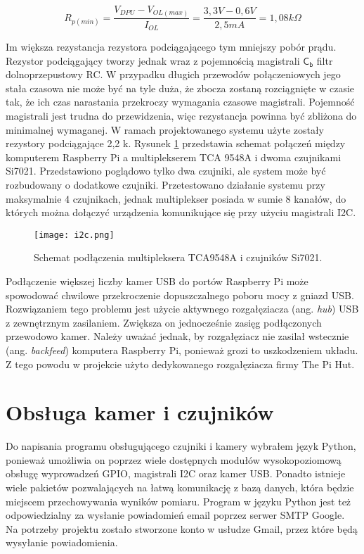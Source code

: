 \documentclass[a4paper,11pt,twoside]{article}
\begin{document}
\begin{equation} \label{pullup}
R_{p(min)} = \frac{V_{DPU} - V_{OL(max)}}{I_{OL}} = \frac{3,3 V - 0,6 V}{2,5 mA} = 1,08 k\Omega  
\end{equation} 

Im większa rezystancja rezystora podciągającego tym mniejszy pobór prądu. Rezystor podciągający tworzy jednak wraz z pojemnością magistrali $\mathsf{C_{b}}$ filtr dolnoprzepustowy RC. W przypadku długich przewodów połączeniowych jego stała czasowa nie może być na tyle duża, że zbocza zostaną rozciągnięte w czasie tak, że ich czas narastania przekroczy wymagania czasowe magistrali. Pojemność magistrali jest trudna do przewidzenia, więc rezystancja powinna być zbliżona do minimalnej wymaganej. W ramach projektowanego systemu użyte zostały rezystory podciągające 2,2 k\textOmega. Rysunek \ref{fig: i2c_schemat} przedstawia schemat połączeń między komputerem Raspberry Pi a multiplekserem TCA 9548A i dwoma czujnikami Si7021. Przedstawiono poglądowo tylko dwa czujniki, ale system może być rozbudowany o dodatkowe czujniki. Przetestowano działanie systemu przy maksymalnie 4 czujnikach, jednak multiplekser posiada w sumie 8 kanałów, do których można dołączyć urządzenia komunikujące się przy użyciu magistrali I2C.

\begin{figure}[h]
\texttt{[image: i2c.png]}
\caption{Schemat podłączenia multipleksera TCA9548A i czujników Si7021.}
\label{fig: i2c_schemat}
\end{figure}

Podłączenie większej liczby kamer USB do portów Raspberry Pi może spowodować chwilowe przekroczenie dopuszczalnego poboru mocy z gniazd USB. Rozwiązaniem tego problemu jest użycie aktywnego rozgałęziacza (ang. \textit{hub}) USB z zewnętrznym zasilaniem. Zwiększa on jednocześnie zasięg podłączonych przewodowo kamer. Należy uważać jednak, by rozgałęziacz nie zasilał wstecznie (ang. \textit{backfeed}) komputera Raspberry Pi, ponieważ grozi to uszkodzeniem układu. Z tego powodu w projekcie użyto dedykowanego rozgałęziacza firmy The Pi Hut.

\newpage
\section{Obsługa kamer i czujników}
Do napisania programu obsługującego czujniki i kamery wybrałem język Python, ponieważ umożliwia on poprzez wiele dostępnych modułów wysokopoziomową obsługę wyprowadzeń GPIO, magistrali I2C oraz kamer USB. Ponadto istnieje wiele pakietów pozwalających na łatwą komunikację z bazą danych, która będzie miejscem przechowywania wyników pomiaru. Program w języku Python jest też odpowiedzialny za wysłanie powiadomień email poprzez serwer SMTP Google. Na potrzeby projektu zostało stworzone konto w usłudze Gmail, przez które będą wysyłanie powiadomienia. 
\end{document}
